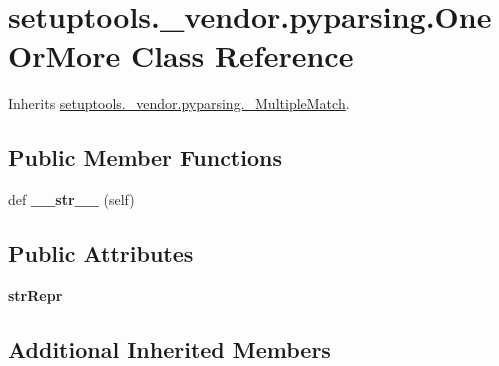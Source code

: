 \hypertarget{classsetuptools_1_1__vendor_1_1pyparsing_1_1_one_or_more}{}\section{setuptools.\+\_\+vendor.\+pyparsing.\+One\+Or\+More Class Reference}
\label{classsetuptools_1_1__vendor_1_1pyparsing_1_1_one_or_more}


Inherits \hyperlink{classsetuptools_1_1__vendor_1_1pyparsing_1_1___multiple_match}{setuptools.\+\_\+vendor.\+pyparsing.\+\_\+\+Multiple\+Match}.

\subsection*{Public Member Functions}
\begin{DoxyCompactItemize}
\item 
\mbox{\label{classsetuptools_1_1__vendor_1_1pyparsing_1_1_one_or_more_a0ae3a5700eda959018801f21bc695aa2}} 
def {\bfseries \+\_\+\+\_\+str\+\_\+\+\_\+} (self)
\end{DoxyCompactItemize}
\subsection*{Public Attributes}
\begin{DoxyCompactItemize}
\item 
\mbox{\label{classsetuptools_1_1__vendor_1_1pyparsing_1_1_one_or_more_a883dd01ccfe60d6fdab612eeb2e3eb9c}} 
{\bfseries str\+Repr}
\end{DoxyCompactItemize}
\subsection*{Additional Inherited Members}


